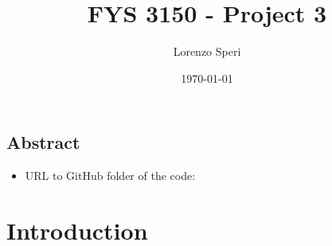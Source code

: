 \documentclass[%
preprint,
 amsmath,amssymb,
 aps,
]{revtex4-1}
\theoremstyle{plain}
\theoremstyle{definition}
\theoremstyle{plain}
\begin{document}
\title{FYS 3150 - Project 3}%


\author{Lorenzo Speri}
%


\date{\today}%
\maketitle

\begin{center}
\section{Abstract}

\end{center}


\begin{itemize}
\item URL to GitHub folder of the code: \url{}
\end{itemize}




\section{Introduction}
\end{document}
